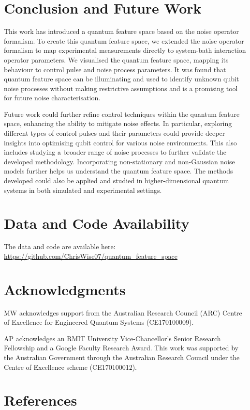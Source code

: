 \documentclass[12pt]{iopart}
\begin{document}
\section{Conclusion and Future Work \label{sec:conclusion_and_future_work}}
This work has introduced a quantum feature space based on the noise operator formalism. To create this quantum feature space, we extended the noise operator formalism to map experimental measurements directly to system-bath interaction operator parameters. We visualised the quantum feature space, mapping its behaviour to control pulse and noise process parameters. It was found that quantum feature space can be illuminating and used to identify unknown qubit noise processes without making restrictive assumptions and is a promising tool for future noise characterisation.

Future work could further refine control techniques within the quantum feature space, enhancing the ability to mitigate noise effects. In particular, exploring different types of control pulses and their parameters could provide deeper insights into optimising qubit control for various noise environments. This also includes studying a broader range of noise processes to further validate the developed methodology. Incorporating non-stationary and non-Gaussian noise models further helps us understand the quantum feature space. The methods developed could also be applied and studied in higher-dimensional quantum systems in both simulated and experimental settings.

\section{Data and Code Availability \label{sec:data_and_code_availability}}
The data and code are available here:
\\
\url{https://github.com/ChrisWise07/quantum_feature_space}
\section*{Acknowledgments \label{sec:acknowledgments}}
MW acknowledges support from the Australian Research Council (ARC) Centre of Excellence for Engineered Quantum Systems (CE170100009).

AP acknowledges an RMIT University Vice-Chancellor's Senior Research Fellowship and a Google Faculty Research Award. This work was supported by the Australian Government through the Australian Research Council under the Centre of Excellence scheme (CE170100012).
\section{References}


\end{document}
